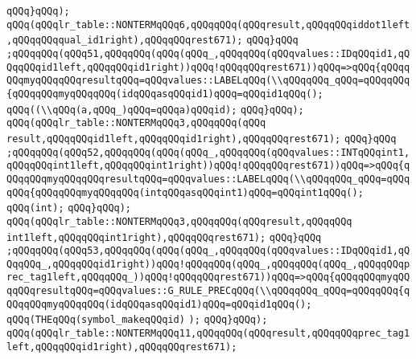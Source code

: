 \verb|qQQq}qQQq);|\newline
\verb|qQQq(qQQqlr_table::NONTERMqQQq6,qQQqqQQq(qQQqresult,qQQqqQQqiddot1left,qQQqqQQqqual_id1right),qQQqqQQqrest671);|\newline
\verb|qQQq}qQQq|\newline
\verb|;qQQqqQQq(qQQq51,qQQqqQQq(qQQq(qQQq_,qQQqqQQq(qQQqvalues::IDqQQqid1,qQQqqQQqid1left,qQQqqQQqid1right))qQQq!qQQqqQQqrest671))qQQq=>qQQq{qQQqqQQqmyqQQqqQQqresultqQQq=qQQqvalues::LABELqQQq(\\qQQqqQQq_qQQq=qQQqqQQq{qQQqqQQqmyqQQqqQQq(idqQQqasqQQqid1)qQQq=qQQqid1qQQq();|\newline
\verb|qQQq((\\qQQq(a,qQQq_)qQQq=qQQqa)qQQqid);|\newline
\verb|qQQq}qQQq);|\newline
\verb|qQQq(qQQqlr_table::NONTERMqQQq3,qQQqqQQq(qQQq|\newline
\verb|result,qQQqqQQqid1left,qQQqqQQqid1right),qQQqqQQqrest671);|\newline
\verb|qQQq}qQQq|\newline
\verb|;qQQqqQQq(qQQq52,qQQqqQQq(qQQq(qQQq_,qQQqqQQq(qQQqvalues::INTqQQqint1,qQQqqQQqint1left,qQQqqQQqint1right))qQQq!qQQqqQQqrest671))qQQq=>qQQq{qQQqqQQqmyqQQqqQQqresultqQQq=qQQqvalues::LABELqQQq(\\qQQqqQQq_qQQq=qQQqqQQq{qQQqqQQqmyqQQqqQQq(intqQQqasqQQqint1)qQQq=qQQqint1qQQq();|\newline
\verb|qQQq(int);|\newline
\verb|qQQq}qQQq);|\newline
\verb|qQQq(qQQqlr_table::NONTERMqQQq3,qQQqqQQq(qQQqresult,qQQqqQQq|\newline
\verb|int1left,qQQqqQQqint1right),qQQqqQQqrest671);|\newline
\verb|qQQq}qQQq|\newline
\verb|;qQQqqQQq(qQQq53,qQQqqQQq(qQQq(qQQq_,qQQqqQQq(qQQqvalues::IDqQQqid1,qQQqqQQq_,qQQqqQQqid1right))qQQq!qQQqqQQq(qQQq_,qQQqqQQq(qQQq_,qQQqqQQqprec_tag1left,qQQqqQQq_))qQQq!qQQqqQQqrest671))qQQq=>qQQq{qQQqqQQqmyqQQqqQQqresultqQQq=qQQqvalues::G_RULE_PRECqQQq(\\qQQqqQQq_qQQq=qQQqqQQq{qQQqqQQqmyqQQqqQQq(idqQQqasqQQqid1)qQQq=qQQqid1qQQq();|\newline
\verb|qQQq(THEqQQq(symbol_makeqQQqid)|\newline
\verb|);|\newline
\verb|qQQq}qQQq);|\newline
\verb|qQQq(qQQqlr_table::NONTERMqQQq11,qQQqqQQq(qQQqresult,qQQqqQQqprec_tag1left,qQQqqQQqid1right),qQQqqQQqrest671);|\newline
